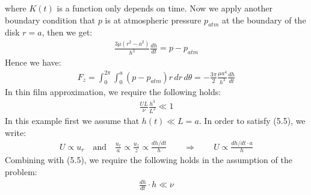 \documentclass[11pt]{book}
\theoremstyle{break}
\theoremstyle{break}
\begin{document}
where $K(t)$ is a function only depends on time. Now we apply another boundary condition that $p$ is at atmospheric pressure $p_{atm}$ at the boundary of the disk $r = a$, then we get:
\begin{align*}
\frac{3\mu (r^2 - a^2)}{h^3}\frac{dh}{dt} = p - p_{atm}
\end{align*}
Hence we have:
\begin{align*}
F_z = \int_0^{2\pi}\int_0^a (p - p_{atm})r\, dr\,d\theta = -\frac{3\pi}{2}\frac{\mu a^4}{h^3} \frac{dh}{dt}
\end{align*}
In thin film approximation, we require the following holds:
\begin{align}
\frac{UL}{\nu} \frac{h^3}{L^2} \ll 1
\end{align}
In this example first we assume that $h(t) \ll L  = a$. In order to satisfy (5.5), we write:
\begin{align*}
U \propto u_r \quad\text{and}\quad \frac{u_r}{a} \propto \frac{u_z}{z} \propto \frac{dh/dt}{h} \qquad \Rightarrow \qquad U\propto \frac{dh/dt \cdot a}{h}
\end{align*}
Combining with (5.5), we require the following holds in the assumption of the problem:
\begin{align*}
\frac{dh}{dt}\cdot h \ll \nu
\end{align*}
\end{document}
